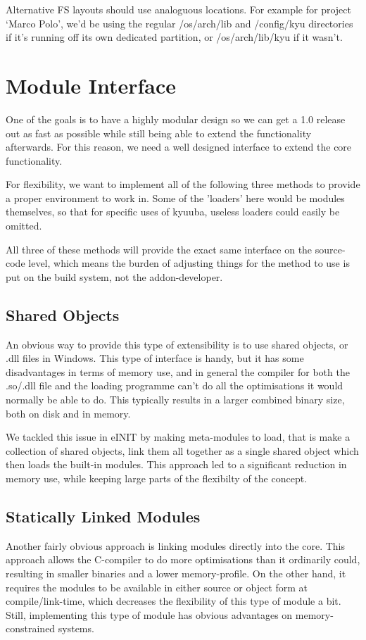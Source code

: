 \documentclass[a4paper,twoside,titlepage]{article}
\begin{document}
Alternative FS layouts should use analoguous locations. For example for project
`Marco Polo', we'd be using the regular /os/arch/lib and /config/kyu directories
if it's running off its own dedicated partition, or /os/arch/lib/kyu if it
wasn't.

\section{Module Interface}
One of the goals is to have a highly modular design so we can get a 1.0 release
out as fast as possible while still being able to extend the functionality
afterwards. For this reason, we need a well designed interface to extend the
core functionality.

For flexibility, we want to implement all of the following three methods to
provide a proper environment to work in. Some of the 'loaders' here would be
modules themselves, so that for specific uses of kyuuba, useless loaders could
easily be omitted.

All three of these methods will provide the exact same interface on the
source-code level, which means the burden of adjusting things for the method to
use is put on the build system, not the addon-developer.

\subsection{Shared Objects}
An obvious way to provide this type of extensibility is to use shared objects,
or .dll files in Windows. This type of interface is handy, but it has some
disadvantages in terms of memory use, and in general the compiler for both the
.so/.dll file and the loading programme can't do all the optimisations it would
normally be able to do. This typically results in a larger combined binary size,
both on disk and in memory.

We tackled this issue in eINIT by making meta-modules to load, that is make a
collection of shared objects, link them all together as a single shared object
which then loads the built-in modules. This approach led to a significant
reduction in memory use, while keeping large parts of the flexibilty of the
concept.

\subsection{Statically Linked Modules}
Another fairly obvious approach is linking modules directly into the core. This
approach allows the C-compiler to do more optimisations than it ordinarily
could, resulting in smaller binaries and a lower memory-profile. On the other
hand, it requires the modules to be available in either source or object form at
compile/link-time, which decreases the flexibility of this type of module a bit.
Still, implementing this type of module has obvious advantages on
memory-constrained systems.
\end{document}
